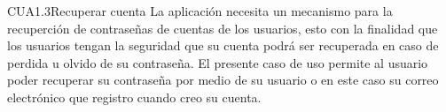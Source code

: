 
\begin{UseCase}{CUA1.3}{Recuperar cuenta}
    {
	La aplicación necesita un mecanismo para la recuperción de contraseñas de cuentas de los usuarios, esto con la finalidad que los usuarios tengan la seguridad que su cuenta podrá ser recuperada en caso de perdida u olvido de su contraseña. El presente caso de uso permite al usuario poder recuperar su contraseña por medio de su usuario o en este caso su correo electrónico que registro cuando creo su cuenta.
    }

\end{UseCase}
